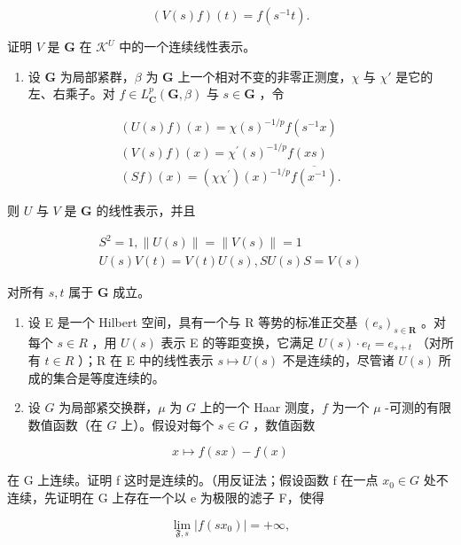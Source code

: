 \[
(V (s) f) (t) = f \left(s ^ {- 1} t\right).
\]

证明 \(V\) 是 \(\mathbf{G}\) 在 \(\mathcal{K}^U\) 中的一个连续线性表示。

\begin{enumerate}
\def\labelenumi{\arabic{enumi})}
\setcounter{enumi}{5}
\tightlist
\item
  设 \(\mathbf{G}\) 为局部紧群，\(\beta\) 为 \(\mathbf{G}\) 上一个相对不变的非零正测度，\(\chi\) 与 \(\chi'\) 是它的左、右乘子。对 \(f \in L_{\mathbf{C}}^{p}(\mathbf{G}, \beta)\) 与 \(s \in \mathbf{G}\) ，令
\end{enumerate}

\[
\begin{array}{c} (U (s) f) (x) = \chi (s) ^ {- 1 / p} f (s ^ {- 1} x) \\ (V (s) f) (x) = \chi^ {\prime} (s) ^ {- 1 / p} f (x s) \\ (S f) (x) = (\chi \chi^ {\prime}) (x) ^ {- 1 / p} \overline {{f (x ^ {- 1})}}. \end{array}
\]

则 \(U\) 与 \(V\) 是 \(\mathbf{G}\) 的线性表示，并且

\[
\begin{array}{c} S ^ {2} = 1, \| U (s) \| = \| V (s) \| = 1 \\ U (s) V (t) = V (t) U (s), S U (s) S = V (s) \end{array}
\]

对所有 \(s, t\) 属于 \(\mathbf{G}\) 成立。

\begin{enumerate}
\def\labelenumi{\arabic{enumi})}
\setcounter{enumi}{6}
\item
  设 E 是一个 Hilbert 空间，具有一个与 R 等势的标准正交基 \((e_{s})_{s\in\mathbf{R}}\) 。对每个 \(s\in R\) ，用 \(U(s)\) 表示 E 的等距变换，它满足 \(U(s)\cdot e_{t}=e_{s+t}\) （对所有 \(t\in R\) ）；R 在 E 中的线性表示 \(s\mapsto U(s)\) 不是连续的，尽管诸 \(U(s)\) 所成的集合是等度连续的。
\item
  设 \(G\) 为局部紧交换群，\(\mu\) 为 \(G\) 上的一个 Haar 测度，\(f\) 为一个 \(\mu\) -可测的有限数值函数（在 \(G\) 上）。假设对每个 \(s \in G\) ，数值函数
\end{enumerate}

\[
x \mapsto f (s x) - f (x)
\]

在 G 上连续。证明 f 这时是连续的。（用反证法；假设函数 f 在一点 \(x_{0} \in G\) 处不连续，先证明在 G 上存在一个以 e 为极限的滤子 F，使得

\[
\lim _ {\mathfrak {F}, s} | f (s x _ {0}) | = + \infty ,
\]

